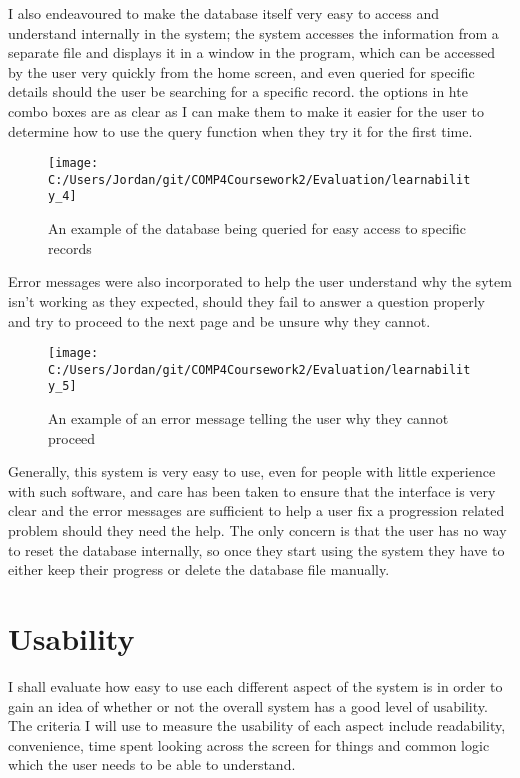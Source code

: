 I also endeavoured to make the database itself very easy to access and understand internally in the system; the system accesses the information from a separate file and displays it in a window in the program, which can be accessed by the user very quickly from the home screen, and even queried for specific details should the user be searching for a specific record. the options in hte combo boxes are as clear as I can make them to make it easier for the user to determine how to use the query function when they try it for the first time.

\begin{figure}[H]
	\texttt{[image: C:/Users/Jordan/git/COMP4Coursework2/Evaluation/learnability\_4]}
	\caption{An example of the database being queried for easy access to specific records}
\end{figure}

Error messages were also incorporated to help the user understand why the sytem isn't working as they expected, should they fail to answer a question properly and try to proceed to the next page and be unsure why they cannot.

\begin{figure}[H]
	\texttt{[image: C:/Users/Jordan/git/COMP4Coursework2/Evaluation/learnability\_5]}
	\caption{An example of an error message telling the user why they cannot proceed}
\end{figure}

Generally, this system is very easy to use, even for people with little experience with such software, and care has been taken to ensure that the interface is very clear and the error messages are sufficient to help a user fix a progression related problem should they need the help. The only concern is that the user has no way to reset the database internally, so once they start using the system they have to either keep their progress or delete the database file manually.

\section{Usability}

I shall evaluate how easy to use each different aspect of the system is in order to gain an idea of whether or not the overall system has a good level of usability. The criteria I will use to measure the usability of each aspect include readability, convenience, time spent looking across the screen for things and common logic which the user needs to be able to understand.

